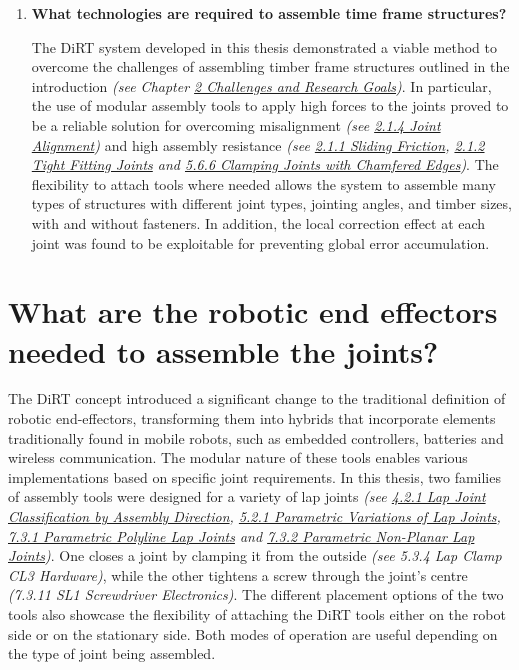 \documentclass[11pt]{book}
\begin{document}
\begin{enumerate}
	\item \textbf{What technologies are required to assemble time frame structures?}

The DiRT system developed in this thesis demonstrated a viable method to overcome the challenges of assembling timber frame structures outlined in the introduction \textit{(see Chapter \uline{2 Challenges and Research Goals})}. In particular, the use of modular assembly tools to apply high forces to the joints proved to be a reliable solution for overcoming misalignment \textit{(see \uline{2.1.4 Joint Alignment}) }and high assembly resistance \textit{(see \uline{2.1.1 Sliding Friction}, \uline{2.1.2 Tight Fitting Joints} and \uline{5.6.6 Clamping Joints with Chamfered Edges})}. The flexibility to attach tools where needed allows the system to assemble many types of structures with different joint types, jointing angles, and timber sizes, with and without fasteners. In addition, the local correction effect at each joint was found to be exploitable for preventing global error accumulation.

\end{enumerate}
\section{What are the robotic end effectors needed to assemble the joints?}

The DiRT concept introduced a significant change to the traditional definition of robotic end-effectors, transforming them into hybrids that incorporate elements traditionally found in mobile robots, such as embedded controllers, batteries and wireless communication. The modular nature of these tools enables various implementations based on specific joint requirements. In this thesis, two families of assembly tools were designed for a variety of lap joints \textit{(see \uline{4.2.1 Lap Joint Classification by Assembly Direction}, \uline{5.2.1 Parametric Variations of Lap Joints}, \uline{7.3.1 Parametric Polyline Lap Joints} and \uline{7.3.2 Parametric Non-Planar Lap Joints})}. One closes a joint by clamping it from the outside \textit{(see 5.3.4 Lap Clamp CL3 Hardware)}, while the other tightens a screw through the joint's centre \textit{(7.3.11 SL1 Screwdriver Electronics)}. The different placement options of the two tools also showcase the flexibility of attaching the DiRT tools either on the robot side or on the stationary side. Both modes of operation are useful depending on the type of joint being assembled.
\end{document}

